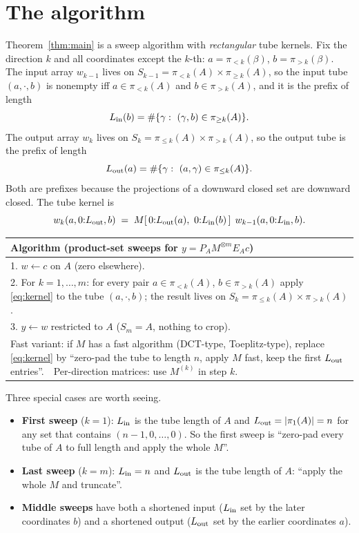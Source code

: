 \documentclass[11pt]{article}
\newcommand{\PA}{P_{\!A}}\newcommand{\EA}{E_{A}}\newcommand{\KA}{K_{\!A}}
\newcommand{\pr}[1]{\pi_{#1}}
\begin{document}
\section{The algorithm}\label{sec:algo}
Theorem~\ref{thm:main} is a sweep algorithm with \emph{rectangular} tube kernels. Fix the direction $k$ and all
coordinates except the $k$-th: $a=\pr{<k}(\beta)$, $b=\pr{>k}(\beta)$. The input array $w_{k-1}$ lives on
$S_{k-1}=\pr{<k}(A)\times\pr{\ge k}(A)$, so the input tube $(a,\cdot,b)$ is nonempty iff $a\in\pr{<k}(A)$ and $b\in\pr{>k}(A)$,
and it is the prefix of length
\[
 L_{\rm in}(b)=\#\{\gamma:\ (\gamma,b)\in\pr{\ge k}(A)\}.
\]
The output array $w_k$ lives on $S_k=\pr{\le k}(A)\times\pr{>k}(A)$, so the output tube is the prefix of length
\[
 L_{\rm out}(a)=\#\{\gamma:\ (a,\gamma)\in\pr{\le k}(A)\}.
\]
Both are prefixes because the projections of a downward closed set are downward closed. The tube kernel is
\begin{equation}\label{eq:kernel}
 w_k(a,0{:}L_{\rm out},b)\;=\;M[\,0{:}L_{\rm out}(a),\ 0{:}L_{\rm in}(b)\,]\;\,w_{k-1}(a,0{:}L_{\rm in},b).
\end{equation}
\begin{center}
\begin{tabular}{@{}p{}@{}}
\toprule
\textbf{Algorithm} (product-set sweeps for $y=\PA M^{\otimes m}\EA c$)\\
\midrule
1. $w\leftarrow c$ on $A$ (zero elsewhere).\\
2. For $k=1,\dots,m$: for every pair $a\in\pr{<k}(A)$, $b\in\pr{>k}(A)$ apply \eqref{eq:kernel} to the tube $(a,\cdot,b)$;
   the result lives on $S_k=\pr{\le k}(A)\times\pr{>k}(A)$.\\
3. $y\leftarrow w$ restricted to $A$ ($S_m=A$, nothing to crop).\\
\midrule
Fast variant: if $M$ has a fast algorithm (DCT-type, Toeplitz-type), replace \eqref{eq:kernel} by ``zero-pad the tube
to length $n$, apply $M$ fast, keep the first $L_{\rm out}$ entries''.\ \ Per-direction matrices: use $M^{(k)}$ in step $k$.\\
\bottomrule
\end{tabular}
\end{center}
Three special cases are worth seeing.
\begin{itemize}
\item \textbf{First sweep} ($k=1$): $L_{\rm in}$ is the tube length of $A$ and $L_{\rm out}=|\pr{1}(A)|=n$ for any set
      that contains $(n-1,0,\dots,0)$. So the first sweep is ``zero-pad every tube of $A$ to full length and apply the
      whole $M$''.
\item \textbf{Last sweep} ($k=m$): $L_{\rm in}=n$ and $L_{\rm out}$ is the tube length of $A$: ``apply the whole $M$ and truncate''.
\item \textbf{Middle sweeps} have both a shortened input ($L_{\rm in}$ set by the later coordinates $b$) and a shortened
      output ($L_{\rm out}$ set by the earlier coordinates $a$).
\end{itemize}
\end{document}

